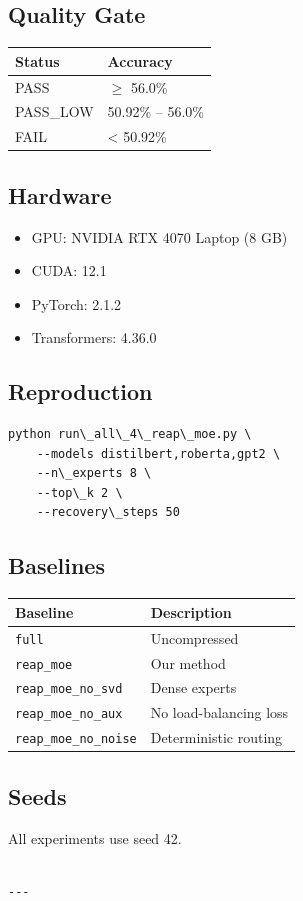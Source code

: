 \subsection{Quality Gate}

\begin{table}[H]
\centering
\small
\begin{tabular}{ll}
\toprule
\textbf{Status} & \textbf{Accuracy} \\
\midrule
PASS & $\ge$ 56.0\% \\
PASS\_LOW & 50.92\% -- 56.0\% \\
FAIL & \textless{} 50.92\% \\
\bottomrule
\end{tabular}
\end{table}

\subsection{Hardware}

\begin{itemize}
\item GPU: NVIDIA RTX 4070 Laptop (8 GB)
\item CUDA: 12.1
\item PyTorch: 2.1.2
\item Transformers: 4.36.0

\end{itemize}
\subsection{Reproduction}

\begin{lstlisting}
python run\_all\_4\_reap\_moe.py \
    --models distilbert,roberta,gpt2 \
    --n\_experts 8 \
    --top\_k 2 \
    --recovery\_steps 50
\end{lstlisting}

\subsection{Baselines}

\begin{table}[H]
\centering
\small
\begin{tabular}{ll}
\toprule
\textbf{Baseline} & \textbf{Description} \\
\midrule
\texttt{full} & Uncompressed \\
\texttt{reap\_moe} & Our method \\
\texttt{reap\_moe\_no\_svd} & Dense experts \\
\texttt{reap\_moe\_no\_aux} & No load-balancing loss \\
\texttt{reap\_moe\_no\_noise} & Deterministic routing \\
\bottomrule
\end{tabular}
\end{table}

\subsection{Seeds}

All experiments use seed 42.
\begin{lstlisting}

---
\end{lstlisting}